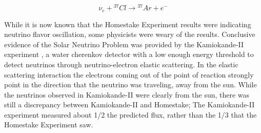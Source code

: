 \begin{equation}
\label{eq:capture}
\nu_{e} +{}^{37}Cl \rightarrow {}^{37}Ar + e^{-}
\end{equation}

While it is now known that the Homestake Experiment results were indicating neutrino flavor oscillation, some physicists were weary of the results. Conclusive evidence of the Solar Neutrino Problem was provided by the Kamiokande-II experiment \cite{kamiokande}, a water cherenkov detector with a low enough energy threshold to detect neutrinos through neutrino-electron elastic scattering. In the elastic scattering interaction the electrons coming out of the point of reaction strongly point in the direction that the neutrino was traveling, away from the sun. While the neutrinos observed in Kamiokande-II were clearly from the sun, there was still a discrepancy between Kamiokande-II and Homestake; The Kamiokande-II experiment measured about 1/2 the predicted flux, rather than the 1/3 that the Homestake Experiment saw.

